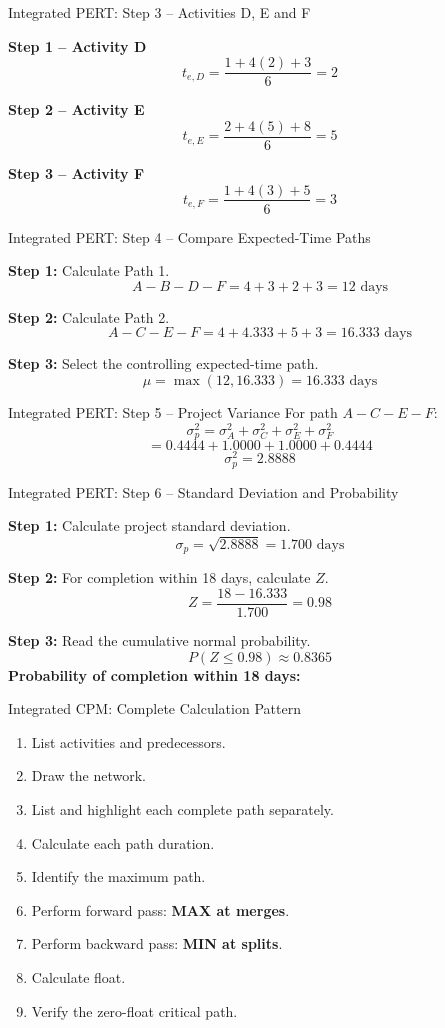\documentclass[aspectratio=169,10pt]{beamer}
\begin{document}
\begin{frame}{Integrated PERT: Step 3 -- Activities D, E and F}
\small
\par\textbf{Step 1 -- Activity D}
\[
t_{e,D}=\frac{1+4(2)+3}{6}=\boxed{2}
\]
\pause
\par\textbf{Step 2 -- Activity E}
\[
t_{e,E}=\frac{2+4(5)+8}{6}=\boxed{5}
\]
\pause
\par\textbf{Step 3 -- Activity F}
\[
t_{e,F}=\frac{1+4(3)+5}{6}=\boxed{3}
\]
\end{frame}

\begin{frame}{Integrated PERT: Step 4 -- Compare Expected-Time Paths}
\small
\par\textbf{Step 1:} Calculate Path 1.
\[
A-B-D-F=4+3+2+3=\boxed{12\text{ days}}
\]
\pause
\par\textbf{Step 2:} Calculate Path 2.
\[
A-C-E-F=4+4.333+5+3=\boxed{16.333\text{ days}}
\]
\pause
\par\textbf{Step 3:} Select the controlling expected-time path.
\[
\mu=\max(12,16.333)=\boxed{16.333\text{ days}}
\]
\end{frame}

\begin{frame}{Integrated PERT: Step 5 -- Project Variance}
For path $A-C-E-F$:
\pause
\[\sigma_p^2=\sigma_A^2+\sigma_C^2+\sigma_E^2+\sigma_F^2\]
\pause
\[=0.4444+1.0000+1.0000+0.4444\]
\pause
\[\boxed{\sigma_p^2=2.8888}\]
\end{frame}

\begin{frame}{Integrated PERT: Step 6 -- Standard Deviation and Probability}
\small
\par\textbf{Step 1:} Calculate project standard deviation.
\[
\sigma_p=\sqrt{2.8888}=\boxed{1.700\text{ days}}
\]
\pause
\par\textbf{Step 2:} For completion within 18 days, calculate $Z$.
\[
Z=\frac{18-16.333}{1.700}=\boxed{0.98}
\]
\pause
\par\textbf{Step 3:} Read the cumulative normal probability.
\[
P(Z\le0.98)\approx\boxed{0.8365}
\]
\pause
\textbf{Probability of completion within 18 days: }
\end{frame}

\begin{frame}{Integrated CPM: Complete Calculation Pattern}
\begin{enumerate}
  \item List activities and predecessors.
  \item Draw the network.
  \item List and highlight each complete path separately.
  \item Calculate each path duration.
  \item Identify the maximum path.
  \item Perform forward pass: \textbf{MAX at merges}.
  \item Perform backward pass: \textbf{MIN at splits}.
  \item Calculate float.
  \item Verify the zero-float critical path.
\end{enumerate}
\end{frame}
\end{document}
